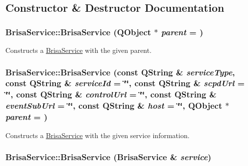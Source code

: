 \subsection{Constructor \& Destructor Documentation}
\hypertarget{classBrisaUpnp_1_1BrisaService_ac545cd7f0be250187f84fd26c9e58433}{
\subsubsection[{BrisaService}]{\setlength{\rightskip}{0pt plus 5cm}BrisaService::BrisaService (QObject $\ast$ {\em parent} = {})}}
\label{classBrisaUpnp_1_1BrisaService_ac545cd7f0be250187f84fd26c9e58433}


Constructs a \hyperlink{classBrisaUpnp_1_1BrisaService}{BrisaService} with the given parent. \hypertarget{classBrisaUpnp_1_1BrisaService_a83a4522dce19621d62a4997ec8bcb89f}{
\subsubsection[{BrisaService}]{\setlength{\rightskip}{0pt plus 5cm}BrisaService::BrisaService (const QString \& {\em serviceType}, \/  const QString \& {\em serviceId} = {\ttfamily \char`\"{}\char`\"{}}, \/  const QString \& {\em scpdUrl} = {\ttfamily \char`\"{}\char`\"{}}, \/  const QString \& {\em controlUrl} = {\ttfamily \char`\"{}\char`\"{}}, \/  const QString \& {\em eventSubUrl} = {\ttfamily \char`\"{}\char`\"{}}, \/  const QString \& {\em host} = {\ttfamily \char`\"{}\char`\"{}}, \/  QObject $\ast$ {\em parent} = {})}}
\label{classBrisaUpnp_1_1BrisaService_a83a4522dce19621d62a4997ec8bcb89f}


Constructs a \hyperlink{classBrisaUpnp_1_1BrisaService}{BrisaService} with the given service information. \hypertarget{classBrisaUpnp_1_1BrisaService_a10bc466757f498d3948dd677ee7fb759}{
\subsubsection[{BrisaService}]{\setlength{\rightskip}{0pt plus 5cm}BrisaService::BrisaService ({\bf BrisaService} \& {\em service})}}
\label{classBrisaUpnp_1_1BrisaService_a10bc466757f498d3948dd677ee7fb759}


